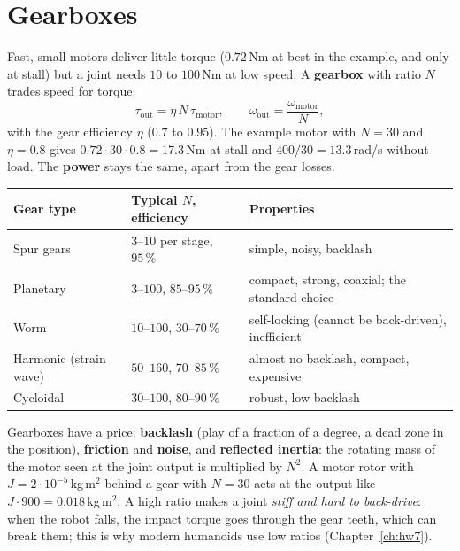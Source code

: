 \section*{Gearboxes}
Fast, small motors deliver little torque ($0.72$\,Nm at best in the example, and only at stall) but a joint needs $10$ to $100$\,Nm at low speed. A \textbf{gearbox} with ratio $N$ trades speed for torque:
\[
\tau_\text{out}=\eta\,N\,\tau_\text{motor},\qquad \omega_\text{out}=\frac{\omega_\text{motor}}{N},
\]
with the gear efficiency $\eta$ ($0.7$ to $0.95$). The example motor with $N=30$ and $\eta=0.8$ gives $0.72\cdot30\cdot0.8=17.3$\,Nm at stall and $400/30=13.3$\,rad/s without load. The \textbf{power} stays the same, apart from the gear losses.
\begin{center}
\renewcommand{\arraystretch}{1.25}
\begin{tabular}{p{3.3cm}p{5.0cm}p{4.7cm}}
\textbf{Gear type} & \textbf{Typical $N$, efficiency} & \textbf{Properties}\\ \hline
Spur gears & $3$--$10$ per stage, $95\,\%$ & simple, noisy, backlash\\
Planetary & $3$--$100$, $85$--$95\,\%$ & compact, strong, coaxial; the standard choice\\
Worm & $10$--$100$, $30$--$70\,\%$ & self-locking (cannot be back-driven), inefficient\\
Harmonic (strain wave) & $50$--$160$, $70$--$85\,\%$ & almost no backlash, compact, expensive\\
Cycloidal & $30$--$100$, $80$--$90\,\%$ & robust, low backlash\\
\end{tabular}
\end{center}
Gearboxes have a price: \textbf{backlash} (play of a fraction of a degree, a dead zone in the position), \textbf{friction} and \textbf{noise}, and \textbf{reflected inertia}: the rotating mass of the motor seen at the joint output is multiplied by $N^2$. A motor rotor with $J=2\cdot10^{-5}$\,kg\,m$^2$ behind a gear with $N=30$ acts at the output like $J\cdot900=0.018$\,kg\,m$^2$. A high ratio makes a joint \emph{stiff and hard to back-drive}: when the robot falls, the impact torque goes through the gear teeth, which can break them; this is why modern humanoids use low ratios (Chapter~\ref{ch:hw7}).

